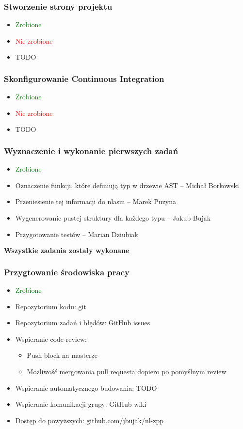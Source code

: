 \documentclass{beamer}
\begin{document}
	\begin{frame}
		\frametitle{Stworzenie strony projektu}
		\begin{itemize}
			\item\textcolor{green}{Zrobione}
			\item\textcolor{red}{Nie zrobione}
			\item TODO
		\end{itemize}
	\end{frame}
	
	\begin{frame}
		\frametitle{Skonfigurowanie Continuous Integration}
		\begin{itemize}
			\item\textcolor{green}{Zrobione}
			\item\textcolor{red}{Nie zrobione}
			\item TODO
		\end{itemize}
	\end{frame}
	
	\begin{frame}
		\frametitle{Wyznaczenie i wykonanie pierwszych zadań}
		\begin{itemize}
			\item \textcolor{green}{Zrobione}
			\item Oznaczenie funkcji, które definiują typ w drzewie AST -- Michał Borkowski
			\item Przeniesienie tej informacji do nlasm -- Marek Puzyna
			\item Wygenerowanie pustej struktury dla każdego typu -- Jakub Bujak
			\item Przygotowanie testów -- Marian Dziubiak
		\end{itemize}
		\pause
		\textbf{Wszystkie zadania zostały wykonane}
	\end{frame}
	
	\begin{frame}
		\frametitle{Przygtowanie środowiska pracy}
		\begin{itemize}
		 \item\textcolor{green}{Zrobione}
		 \item Repozytorium kodu: git
		 \item Repozytorium zadań i błędów: GitHub issues
		 \item Wspieranie code review:
			\begin{itemize}
			\item Push block na masterze
			\item Możliwość mergowania pull requesta dopiero po pomyślnym review
			\end{itemize}
		\item Wspieranie automatycznego budowania: TODO
		\item Wspieranie komunikacji grupy: GitHub wiki
		\item Dostęp do powyższych: github.com/jbujak/nl-zpp
		\end{itemize}
	\end{frame}
	
\end{document}
